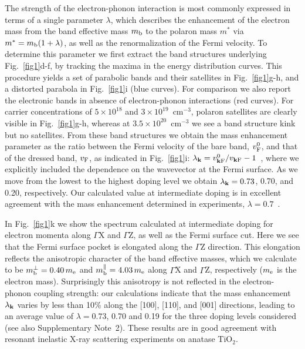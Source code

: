 \documentclass[12pt]{nature}
\begin{document}
The strength of the electron-phonon interaction is most commonly expressed in terms of a single 
parameter $\lambda$, which describes the enhancement of the electron mass from the band effective 
mass $m_{\rm b}$ to the polaron mass $m^*$ via $m^*=m_{\rm b}(1+\lambda)$, as well as the renormalization 
of the Fermi velocity\cite{Grimvall}. To determine this parameter we first extract the band structures 
underlying \mbox{Fig.~\ref{fig1}d-f}, by tracking the maxima in the energy distribution curves. This 
procedure yields a set of parabolic bands and their satellites in \mbox{Fig.~\ref{fig1}g-h}, and a 
distorted parabola in \mbox{Fig.~\ref{fig1}i} (blue curves). For comparison we also report the electronic 
bands in absence of electron-phonon interactions (red curves). For carrier concentrations of $5\times10^{18}$ 
and $3\times10^{19}$~cm$^{-3}$, polaron satellites are clearly visible in \mbox{Fig.~\ref{fig1}g-h}, 
whereas at $3.5\times10^{20}$~cm$^{-3}$ we see a band structure kink but no satellites. From these band 
structures we obtain the mass enhancement parameter as the ratio between the Fermi velocity of the bare band, 
$v^0_{\rm F}$, and that of the dressed band, $v_{\rm F}$, as indicated in Fig.~\ref{fig1}i: 
$\lambda_{\bf k}=v^0_{\bf k\rm F}/v_{\bf k\rm F} - 1$~\cite{Grimvall}, where we explicitly included the 
dependence on the wavevector at the Fermi surface. As we move from the lowest to the highest doping level 
we obtain $\lambda_{\bf k}=0.73$, 0.70, and 0.20, respectively. Our calculated value at intermediate doping 
is in excellent agreement with the mass enhancement determined in experiments, $\lambda=0.7$~\cite{Moser2013}. 

In Fig.~\ref{fig1}k we show the spectrum calculated at intermediate doping for electron momenta 
along $\Gamma$X and $\Gamma$Z, as well as the Fermi surface cut. Here we see that the Fermi 
surface pocket is elongated along the $\Gamma$Z direction. This elongation reflects the anisotropic 
character of the band effective masses, which we calculate to be $m_{\rm b}^\perp =0.40\,m_{\rm e}$ and 
$m_{\rm b}^\parallel =4.03\,m_{\rm e}$ along $\Gamma$X and $\Gamma$Z, respectively ($m_{\rm e}$ is the 
electron mass). Surprisingly this anisotropy is not reflected in the electron-phonon coupling strength: 
our calculations indicate that the mass enhancement $\lambda_{\bf k}$ varies by less than 10\% along 
the [100], [110], and [001] directions, leading to an average value of $\lambda=0.73$, 0.70 and 0.19 
for the three doping levels considered (see also Supplementary Note~2). These results are in good 
agreement with resonant inelastic X-ray scattering experiments on anatase TiO$_2$\cite{Moser2015}. 
\end{document}
